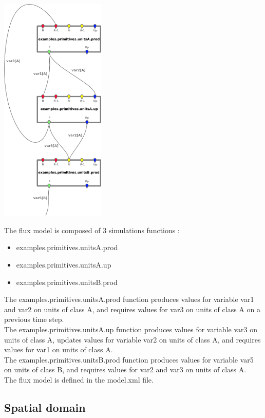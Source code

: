 \documentclass[a4paper,11pt]{article}
\begin{document}
\begin{floatingfigure}[r]{6cm}
\includegraphics[width=5cm]{openfluid_example-primitives_en/model.png}
\end{floatingfigure}
The flux model is composed of 3 simulations functions :\\
\begin{itemize}
\item examples.primitives.unitsA.prod
\item examples.primitives.unitsA.up
\item examples.primitives.unitsB.prod
\end{itemize}
The examples.primitives.unitsA.prod function produces values for 
variable var1 and var2 on units of class A, and requires values for var3 on units of class A 
on a previous time step.\\
The examples.primitives.unitsA.up function produces values for variable var3 on units of class A, 
updates values for variable var2 on units of class A, and requires values for var1 on units of class A.\\
The examples.primitives.unitsB.prod function produces values for variable var5 on units of class B,
and requires values for var2 and var3 on units of class A.\\
The flux model is defined in the model.xml file.

\bigskip
\bigskip

\subsection{Spatial domain}
\end{document}
